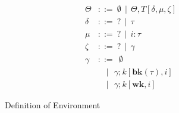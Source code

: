 \begin{figure*}[htb!]
\begin{align*}
      \Theta &::=~ \emptyset ~~ | ~~ \Theta,T[\delta,\mu,\zeta] \\
      \delta &::=~ ? ~~ | ~~ \tau\\
      \mu      &::=~ ? ~~ | ~~ i:\tau\\
            \zeta  &::=~ ? ~~ | ~~ \gamma\\
      \gamma &::=~ ~ \emptyset \\
                  &\quad | ~~~\gamma;k[\mathbf{bk}(\tau),i]\\
                  &\quad | ~~~\gamma;k[\mathbf{wk},i]
\end{align*}
\caption{Definition of Environment}
\label{typechecking-environment}
\end{figure*}
